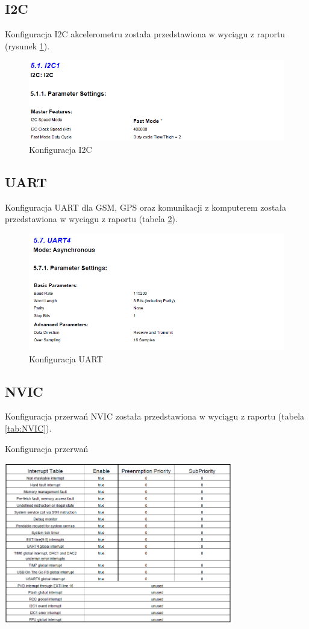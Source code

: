 \documentclass[10pt, a4paper]{article}
\begin{document}
\subsection{I2C}
Konfiguracja I2C akcelerometru została przedstawiona w wyciągu z raportu (rysunek \ref{fig:I2C}).
\begin{figure}[!htb]
\centering
\includegraphics[width=\textwidth]{./KonfiguracjaI2CR.PNG}
\caption{Konfiguracja I2C\label{fig:I2C}}
\end{figure}

\subsection{UART}
Konfiguracja UART dla GSM, GPS oraz komunikacji z komputerem została przedstawiona w wyciągu z raportu (tabela \ref{fig:UART}).
\begin{figure}[!htb]
\centering
\includegraphics[width=\textwidth]{./KonfiguracjaUARTR.PNG}
\caption{Konfiguracja UART\label{fig:UART}}
\end{figure}
\newpage
\subsection{NVIC}
Konfiguracja przerwań NVIC została przedstawiona w wyciągu z raportu (tabela \ref{tab:NVIC}).
\begin{table}[!htb]
\centering
\caption{Konfiguracja przerwań\label{tab:NVIC}}
\includegraphics[width=0.75\textwidth]{./KonfiguracjaNVICR.PNG}
\end{table}
\end{document}
